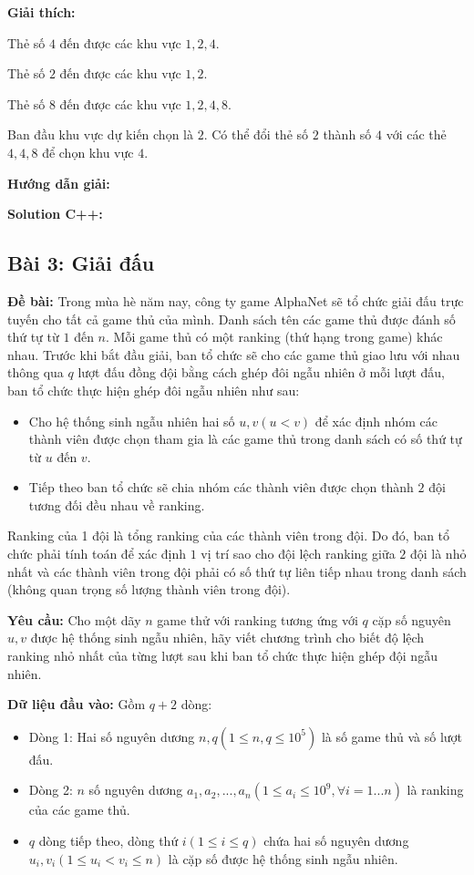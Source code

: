 \documentclass[12pt]{scrartcl}  %
\begin{document}
\textbf{Giải thích:}

Thẻ số $4$ đến được các khu vực $1, 2, 4$.

Thẻ số $2$ đến được các khu vực $1, 2$.

Thẻ số $8$ đến được các khu vực $1, 2, 4, 8$.

Ban đầu khu vực dự kiến chọn là $2$. Có thể đổi thẻ số $2$ thành số $4$ với các thẻ $4, 4, 8$ để chọn khu vực $4$.

\textbf{Hướng dẫn giải:}

\textbf{Solution C++:}

\subsection{Bài 3: Giải đấu}
\textbf{Đề bài:}
Trong mùa hè năm nay, công ty game AlphaNet sẽ tổ chức giải đấu trực tuyến cho tất cả game thủ của mình. Danh sách tên các game thủ được đánh số thứ tự từ $1$ đến $n$. 
Mỗi game thủ có một ranking (thứ hạng trong game) khác nhau. Trước khi bắt đầu giải, ban tổ chức sẽ cho các game thủ giao lưu với nhau thông qua $q$ lượt đấu đồng đội bằng cách ghép đôi ngẫu nhiên ở mỗi lượt đấu, ban tổ chức thực hiện ghép đôi ngẫu nhiên như sau:

\begin{itemize}
    \item Cho hệ thống sinh ngẫu nhiên hai số $u, v (u < v)$ để xác định nhóm các thành viên được chọn tham gia là các game thủ trong danh sách có số thứ tự từ $u$ đến $v$.
    \item Tiếp theo ban tổ chức sẽ chia nhóm các thành viên được chọn thành $2$ đội tương đối đều nhau về ranking.
\end{itemize}

Ranking của 1 đội là tổng ranking của các thành viên trong đội. Do đó, ban tổ chức phải tính toán để xác định $1$ vị trí sao cho đội lệch ranking giữa $2$ đội là nhỏ nhất và các thành viên trong đội phải có số thứ tự liên tiếp nhau trong danh sách (không quan trọng số lượng thành viên trong đội). 

\textbf{Yêu cầu:} Cho một dãy $n$ game thử với ranking tương ứng với $q$ cặp số nguyên $u, v$ được hệ thống sinh ngẫu nhiên, hãy viết chương trình cho biết độ lệch ranking nhỏ nhất của từng lượt sau khi ban tổ chức thực hiện ghép đội ngẫu nhiên. 

\textbf{Dữ liệu đầu vào:}
Gồm $q + 2$ dòng:
\begin{itemize}
    \item Dòng 1: Hai số nguyên dương $n, q (1 \leq n, q \leq 10^5)$ là số game thủ và số lượt đấu.
    \item Dòng 2: $n$ số nguyên dương $a_1, a_2, ..., a_n (1 \leq a_i \leq 10^9, \forall i = 1 ... n)$ là ranking của các game thủ.
    \item $q$ dòng tiếp theo, dòng thứ $i (1 \leq i \leq q)$ chứa hai số nguyên dương $u_i, v_i (1 \leq u_i < v_i \leq n)$ là cặp số được hệ thống sinh ngẫu nhiên.
\end{itemize}
\end{document}
